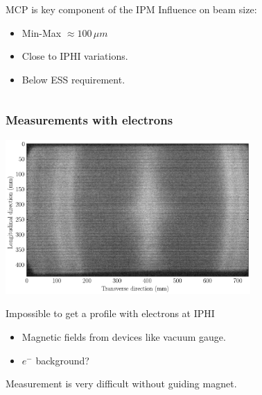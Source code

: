 \begin{frame}[t]
\begin{columns}[]
\begin{column}{0.45\textwidth}
\begin{block}{MCP is key component of the IPM}
        Influence on beam size:
        \begin{itemize}
          \item Min-Max $\approx 100\,\mu m$
          \item Close to IPHI variations.
          \item Below ESS requirement.
        \end{itemize}
      \end{block}
    \end{column}
  \end{columns}
\end{frame}

\begin{frame}[t]
  \frametitle{Measurements with electrons}
  \centering
  \includegraphics[width=0.7\textwidth]{04_Test/fig/fig000_electron_Photonis}
  \begin{block}{Impossible to get a profile with electrons at IPHI}
    \begin{itemize}
      \item Magnetic fields from devices like vacuum gauge.
      \item $e^-$ background?
    \end{itemize}
    Measurement is very difficult without guiding magnet.
  \end{block}
\end{frame}

